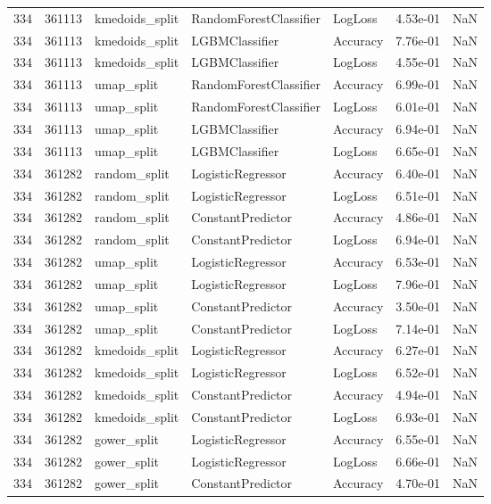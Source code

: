\begin{tabular}{rrlllrr}
334 & 361113 & kmedoids\_split & RandomForestClassifier & LogLoss & 4.53e-01 & NaN \\
334 & 361113 & kmedoids\_split & LGBMClassifier & Accuracy & 7.76e-01 & NaN \\
334 & 361113 & kmedoids\_split & LGBMClassifier & LogLoss & 4.55e-01 & NaN \\
334 & 361113 & umap\_split & RandomForestClassifier & Accuracy & 6.99e-01 & NaN \\
334 & 361113 & umap\_split & RandomForestClassifier & LogLoss & 6.01e-01 & NaN \\
334 & 361113 & umap\_split & LGBMClassifier & Accuracy & 6.94e-01 & NaN \\
334 & 361113 & umap\_split & LGBMClassifier & LogLoss & 6.65e-01 & NaN \\
334 & 361282 & random\_split & LogisticRegressor & Accuracy & 6.40e-01 & NaN \\
334 & 361282 & random\_split & LogisticRegressor & LogLoss & 6.51e-01 & NaN \\
334 & 361282 & random\_split & ConstantPredictor & Accuracy & 4.86e-01 & NaN \\
334 & 361282 & random\_split & ConstantPredictor & LogLoss & 6.94e-01 & NaN \\
334 & 361282 & umap\_split & LogisticRegressor & Accuracy & 6.53e-01 & NaN \\
334 & 361282 & umap\_split & LogisticRegressor & LogLoss & 7.96e-01 & NaN \\
334 & 361282 & umap\_split & ConstantPredictor & Accuracy & 3.50e-01 & NaN \\
334 & 361282 & umap\_split & ConstantPredictor & LogLoss & 7.14e-01 & NaN \\
334 & 361282 & kmedoids\_split & LogisticRegressor & Accuracy & 6.27e-01 & NaN \\
334 & 361282 & kmedoids\_split & LogisticRegressor & LogLoss & 6.52e-01 & NaN \\
334 & 361282 & kmedoids\_split & ConstantPredictor & Accuracy & 4.94e-01 & NaN \\
334 & 361282 & kmedoids\_split & ConstantPredictor & LogLoss & 6.93e-01 & NaN \\
334 & 361282 & gower\_split & LogisticRegressor & Accuracy & 6.55e-01 & NaN \\
334 & 361282 & gower\_split & LogisticRegressor & LogLoss & 6.66e-01 & NaN \\
334 & 361282 & gower\_split & ConstantPredictor & Accuracy & 4.70e-01 & NaN \\

\end{tabular}
